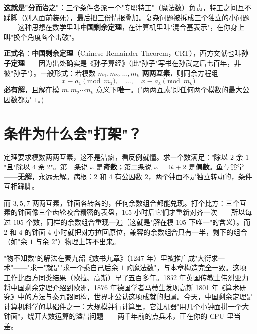 \textbf{这就是"分而治之"}：三个条件各派一个"专职特工"（魔法数）负责，特工之间互不踩脚（别人面前装死），最后把三份情报叠加。复杂问题被拆成三个独立的小问题——这种思想在数学里叫\textbf{中国剩余定理}，在计算机里叫"混合基表示"，在你身上叫"换个角度各个击破"。

\begin{faming}
\textbf{正式名}：\textbf{中国剩余定理}（Chinese Remainder Theorem，CRT），西方文献也叫\textbf{孙子定理}——因为出处确实是《孙子算经》（此"孙子"写书在孙武之后七百年，非彼"孙子"）。一般形式：若模数 $m_1, m_2, \dots, m_k$ \textbf{两两互素}，则同余方程组
\[
x \equiv a_1 \pmod{m_1},\quad \dots,\quad x \equiv a_k \pmod{m_k}
\]
\textbf{必有解}，且解在模 $m_1m_2\cdots m_k$ 意义下\textbf{唯一}。("两两互素"即任何两个模数的最大公因数都是 $1$。)
\end{faming}

\section{条件为什么会"打架"？}

定理要求模数两两互素，这不是洁癖，看反例就懂。求一个数满足："除以 $2$ 余 $1$"且"除以 $4$ 余 $2$"。第一条说 $x$ 是\textbf{奇数}；第二条说 $x = 4k+2$ 是\textbf{偶数}。鱼与熊掌——\textbf{无解}，永远无解。病根：$2$ 和 $4$ 有公因数 $2$，两个钟面不是独立转动的，条件互相踩脚。

而 $3, 5, 7$ 两两互素，钟面各转各的，任何余数组合都能兑现。打个比方：三个互素的钟面像三个齿轮咬合精密的表盘，$105$ 小时后它们才重新对齐一次——所以每过 $105$ 个数，同样的余数组合重现一遍（这就是"解在模 $105$ 下唯一"的含义）。而 $2$ 和 $4$ 的钟面 $4$ 小时就把对方拉回原位，兼容的余数组合只有一半，剩下的组合（如"余 $1$ 与余 $2$"）物理上转不出来。

\begin{lishi}
"物不知数"的解法在秦九韶《数书九章》（1247 年）里被推广成"大衍求一术"——"求一"就是"求一个乘自己后余 $1$ 的魔法数"，与本章构造完全一致。这项工作比西方同类结果（欧拉、高斯）早了五百多年。1852 年英国传教士伟烈亚力将中国剩余定理介绍到欧洲，1876 年德国学者马蒂生发现高斯 1801 年《算术研究》中的方法与秦九韶同构，世界才公认这项成就的归属。今天，中国剩余定理是计算机科学的基础件之一：大规模并行计算里，它让机器"用几个小钟面拼一个大钟面"，绕开大数运算的溢出问题——两千年前的点兵术，正在你的 CPU 里当差。
\end{lishi}

